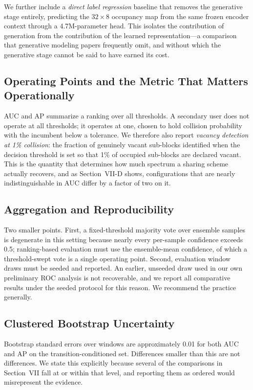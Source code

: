 \documentclass[lettersize,journal]{IEEEtran}
\begin{document}
We further include a \emph{direct label regression} baseline that removes
the generative stage entirely, predicting the $32 \times 8$ occupancy map
from the same frozen encoder context through a 4.7M-parameter head. This
isolates the contribution of generation from the contribution of the
learned representation---a comparison that generative modeling papers
frequently omit, and without which the generative stage cannot be said to
have earned its cost.

\subsection{\textbf{Operating Points and the Metric That Matters Operationally}}
AUC and AP summarize a ranking over all thresholds. A secondary user does
not operate at all thresholds; it operates at one, chosen to hold
collision probability with the incumbent below a tolerance. We therefore
also report \emph{vacancy detection at 1\% collision}: the fraction of
genuinely vacant sub-blocks identified when the decision threshold is set
so that 1\% of occupied sub-blocks are declared vacant. This is the
quantity that determines how much spectrum a sharing scheme actually
recovers, and as Section~VII-D shows, configurations that are nearly
indistinguishable in AUC differ by a factor of two on it.

\subsection{\textbf{Aggregation and Reproducibility}}
\label{sec:aggregation}
Two smaller points. First, a fixed-threshold majority vote over ensemble
samples is degenerate in this setting because nearly every per-sample
confidence exceeds 0.5; ranking-based evaluation must use the
ensemble-mean confidence, of which a threshold-swept vote is a single
operating point. Second, evaluation window draws must be seeded and
reported. An earlier, unseeded draw used in our own preliminary ROC
analysis is not recoverable, and we report all comparative results under
the seeded protocol for this reason. We recommend the practice
generally.

\subsection{\textbf{Clustered Bootstrap Uncertainty}}
Bootstrap standard errors over windows are approximately 0.01 for both
AUC and AP on the transition-conditioned set. Differences smaller than
this are not differences. We state this explicitly because several of the
comparisons in Section~VII fall at or within that level, and reporting
them as ordered would misrepresent the evidence.
\end{document}
